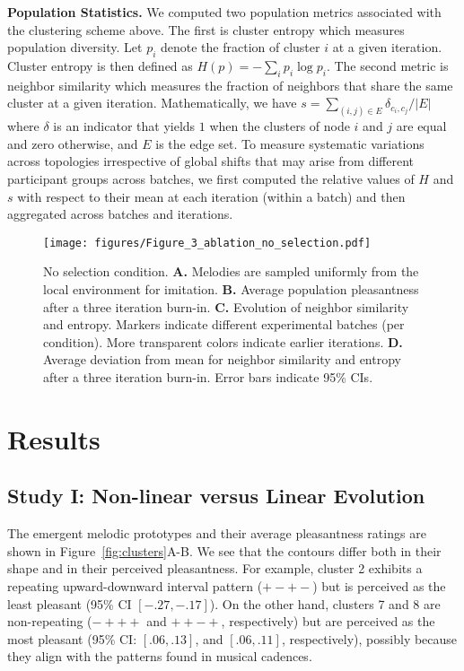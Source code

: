 \documentclass[10pt,letterpaper]{article}
\begin{document}
\noindent\textbf{Population Statistics.} We computed two population metrics associated with the clustering scheme above. The first is cluster entropy which measures population diversity. Let $p_i$ denote the fraction of cluster $i$ at a given iteration. Cluster entropy is then defined as $H(p)=-\sum_ip_i\log p_i$. The second metric is neighbor similarity which measures the fraction of neighbors that share the same cluster at a given iteration. Mathematically, we have $s=\sum_{(i,j)\in E}\delta_{c_i,c_j}/|E|$ where $\delta$ is an indicator that yields $1$ when the clusters of node $i$ and $j$ are equal and zero otherwise, and $E$ is the edge set. To measure systematic variations across topologies irrespective of global shifts that may arise from different participant groups across batches, we first computed the relative values of $H$ and $s$ with respect to their mean at each iteration (within a batch) and then aggregated across batches and iterations.

\begin{figure}[t]
\begin{center}
\texttt{[image: figures/Figure\_3\_ablation\_no\_selection.pdf]}
\end{center}
\vspace{-4mm}
\caption{No selection condition. \textbf{A.} Melodies are sampled uniformly from the local environment for imitation. \textbf{B.} Average population pleasantness after a three iteration burn-in. \textbf{C.} Evolution of neighbor similarity and entropy. Markers indicate different experimental batches (per condition). More transparent colors indicate earlier iterations. \textbf{D.} Average deviation from mean for neighbor similarity and entropy after a three iteration burn-in. Error bars indicate 95\% CIs.}
\label{fig:ablation-selection}
\end{figure}

\section{Results}
\subsection{Study I: Non-linear versus Linear Evolution}
The emergent melodic prototypes and their average pleasantness ratings are shown in Figure~\ref{fig:clusters}A-B. We see that the contours differ both in their shape and in their perceived pleasantness. For example, cluster 2 exhibits a repeating upward-downward interval pattern ($+-+-$) but is perceived as the least pleasant (95\% CI $[-.27,-.17]$). On the other hand, clusters 7 and 8 are non-repeating ($-+++$ and $++-+$, respectively) but are perceived as the most pleasant (95\% CI: $[.06,.13]$, and $[.06,.11]$, respectively), possibly because they align with the patterns found in musical cadences. 
\end{document}
